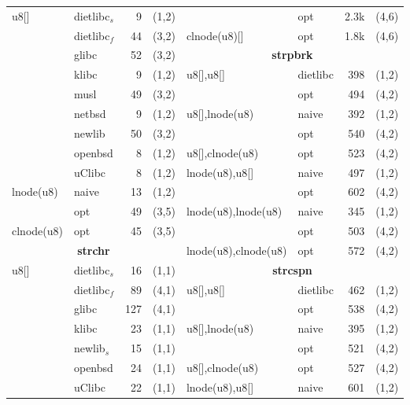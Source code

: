 \begin{table}
\begin{center}
\begin{scriptsize}
\begin{tabular}{@{\hspace{5mm}}l@{\hspace{5px}}l@{\hspace{4mm}}r@{\hspace{4mm}}c@{\hspace{8mm}}l@{\hspace{5px}}l@{\hspace{4mm}}r@{\hspace{4mm}}c@{\hspace{5mm}}}
u8[] & dietlibc$_s$ & 9 & (1,2) &             & opt & 2.3k & (4,6) \\
       & dietlibc$_f$ & 44 & (3,2) &           clnode(u8)[] & opt & 1.8k & (4,6) \\
       & glibc & 52 & (3,2) &                                \multicolumn{4}{c}{\bf strpbrk} \\
       & klibc & 9 & (1,2) &                                 u8[],u8[] & dietlibc & 398 & (1,2) \\
       & musl & 49 & (3,2) &                                 & opt      & 494 & (4,2) \\
       & netbsd & 9 & (1,2) &                                u8[],lnode(u8) & naive & 392 & (1,2) \\
       & newlib & 50 & (3,2) &                               & opt & 540 & (4,2) \\
       & openbsd & 8 & (1,2) &                               u8[],clnode(u8) & opt & 523 & (4,2) \\
       & uClibc & 8 & (1,2) &                                lnode(u8),u8[] & naive & 497 & (1,2) \\
lnode(u8) & naive & 13 & (1,2) &                             & opt & 602 & (4,2) \\
            & opt & 49 & (3,5) &                             lnode(u8),lnode(u8) & naive & 345 & (1,2) \\
clnode(u8) & opt & 45 & (3,5) &                              & opt & 503 & (4,2) \\
 \multicolumn{4}{c}{\bf strchr} &                            lnode(u8),clnode(u8) & opt & 572 & (4,2) \\
u8[] & dietlibc$_s$ & 16 & (1,1) &            \multicolumn{4}{c}{\bf strcspn} \\
       & dietlibc$_f$ & 89 & (4,1) &           u8[],u8[] & dietlibc & 462 & (1,2) \\
       & glibc & 127 & (4,1) &                               & opt      & 538 & (4,2) \\
       & klibc & 23 & (1,1) &                                u8[],lnode(u8) & naive & 395 & (1,2) \\
       & newlib$_s$ & 15 & (1,1) &            & opt & 521 & (4,2) \\
       & openbsd & 24 & (1,1) &                              u8[],clnode(u8) & opt & 527 & (4,2) \\
       & uClibc & 22 & (1,1) &                               lnode(u8),u8[] & naive & 601 & (1,2) \\

\end{tabular}
\end{scriptsize}
\end{center}
\end{table}

